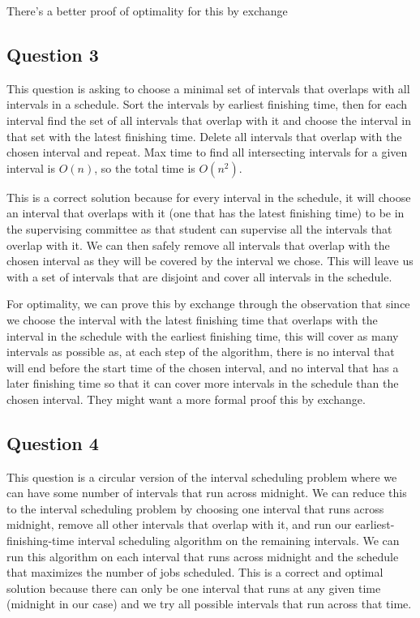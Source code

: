 \documentclass[11pt]{article}
\begin{document}
\* There's a better proof of optimality for this by exchange \*

\subsection{Question 3}

This question is asking to choose a minimal set of intervals that overlaps with all intervals in a schedule. Sort the intervals by earliest finishing time, then for each interval find the set of all intervals that overlap with it and choose the interval in that set with the latest finishing time. Delete all intervals that overlap with the chosen interval and repeat. Max time to find all intersecting intervals for a given interval is $O(n)$, so the total time is $O(n^2)$.

This is a correct solution because for every interval in the schedule, it will choose an interval that overlaps with it (one that has the latest finishing time) to be in the supervising committee as that student can supervise all the intervals that overlap with it. We can then safely remove all intervals that overlap with the chosen interval as they will be covered by the interval we chose. This will leave us with a set of intervals that are disjoint and cover all intervals in the schedule.

For optimality, we can prove this by exchange through the observation that since we choose the interval with the latest finishing time that overlaps with the interval in the schedule with the earliest finishing time, this will cover as many intervals as possible as, at each step of the algorithm, there is no interval that will end before the start time of the chosen interval, and no interval that has a later finishing time so that it can cover more intervals in the schedule than the chosen interval. They might want a more formal proof this by exchange.

\subsection{Question 4}

This question is a circular version of the interval scheduling problem where we can have some number of intervals that run across midnight. We can reduce this to the interval scheduling problem by choosing one interval that runs across midnight, remove all other intervals that overlap with it, and run our earliest-finishing-time interval scheduling algorithm on the remaining intervals. We can run this algorithm on each interval that runs across midnight and the schedule that maximizes the number of jobs scheduled. This is a correct and optimal solution because there can only be one interval that runs at any given time (midnight in our case) and we try all possible intervals that run across that time.
\end{document}

